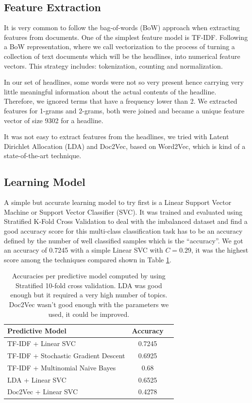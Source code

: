 \documentclass[10pt]{article}
\begin{document}
\subsection{Feature Extraction}

It is very common to follow the bag-of-words (BoW) approach when extracting features from documents. One of the simplest feature model is TF-IDF. Following a BoW representation, where we call vectorization to the process of turning a collection of text documents which will be the headlines, into numerical feature vectors. This strategy includes: tokenization, counting and normalization.

In our set of headlines, some words were not so very present hence carrying very little meaningful information about the actual contents of the headline. Therefore, we ignored terms that have a frequency lower than 2. We extracted features for 1-grams and 2-grams, both were joined and became a unique feature vector of size 9302 for a headline.

It was not easy to extract features from the headlines, we tried with Latent Dirichlet Allocation (LDA) and Doc2Vec, based on Word2Vec, which is kind of a state-of-the-art technique.

\subsection{Learning Model}

A simple but accurate learning model to try first is a Linear Support Vector Machine or Support Vector Classifier (SVC). It was trained and evaluated using Stratified K-Fold Cross Validation to deal with the imbalanced dataset and find a good accuracy score for this multi-class classification task has to be an accuracy defined by the number of well classified samples which is the ``accuracy''. We got an accuracy of 0.7245 with a simple Linear SVC with $C = 0.29$, it was the highest score among the techniques compared shown in Table \ref{tab:compares}.

\begin{table}
\centering
\scriptsize 
\caption{Accuracies per predictive model computed by using Stratified 10-fold cross validation. LDA was good enough but it required a very high number of topics. Doc2Vec wasn't good enough with the parameters we used, it could be improved.}
\label{tab:compares}
\def\arraystretch{1.5}%
 \begin{tabular}{ |>{\centering\arraybackslash}m{4cm} | c | c |}
    \hline
    \rowcolor{LightCyan} Predictive Model & Accuracy \\
    \hline
TF-IDF + Linear SVC & 0.7245\\
    \hline
TF-IDF + Stochastic Gradient Descent & 0.6925\\
    \hline
TF-IDF + Multinomial Naive Bayes & 0.68\\
    \hline
LDA + Linear SVC & 0.6525 \\
    \hline
Doc2Vec + Linear SVC & 0.4278 \\
    \hline
  \end{tabular}
\end{table}
\end{document}
